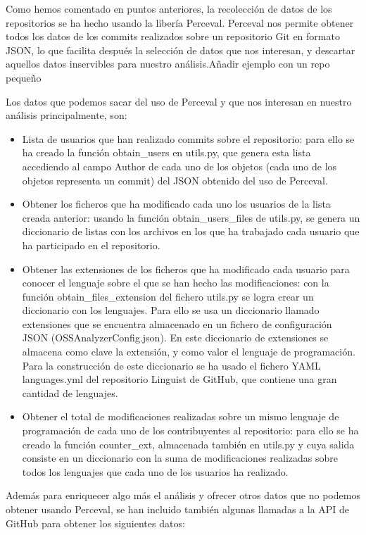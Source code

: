 \documentclass[a4paper, 12pt]{book}
\begin{document}
Como hemos comentado en puntos anteriores, la recolección de datos de los repositorios se ha hecho usando la libería Perceval. Perceval nos permite obtener todos los datos de los commits realizados sobre un repositorio Git en formato JSON, lo que facilita después la selección de datos que nos interesan, y descartar aquellos datos inservibles para nuestro análisis.{Añadir ejemplo con un repo pequeño}

Los datos que podemos sacar del uso de Perceval y que nos interesan en nuestro análisis principalmente, son:

\begin{itemize}
  \item Lista de usuarios que han realizado commits sobre el repositorio: para ello se ha creado la función obtain\_users en utils.py, que genera esta lista accediendo al campo Author de cada uno de los objetos (cada uno de los objetos representa un commit) del JSON obtenido del uso de Perceval.
  \item Obtener los ficheros que ha modificado cada uno los usuarios de la lista creada anterior: usando la función obtain\_users\_files de utils.py, se genera un diccionario de listas con los archivos en los que ha trabajado cada usuario que ha participado en el repositorio.
  \item Obtener las extensiones de los ficheros que ha modificado cada usuario para conocer el lenguaje sobre el que se han hecho las modificaciones: con la función obtain\_files\_extension del fichero utils.py se logra crear un diccionario con los lenguajes. Para ello se usa un diccionario llamado extensiones que se encuentra almacenado en un fichero de configuración JSON (OSSAnalyzerConfig.json). En este diccionario de extensiones se almacena como clave la extensión, y como valor el lenguaje de programación. Para la construcción de este diccionario se ha usado el fichero YAML languages.yml del repositorio Linguist de GitHub, que contiene una gran cantidad de lenguajes.
  \item Obtener el total de modificaciones realizadas sobre un mismo lenguaje de programación de cada uno de los contribuyentes al repositorio: para ello se ha creado la función counter\_ext, almacenada también en utils.py y cuya salida consiste en un diccionario con la suma de modificaciones realizadas sobre todos los lenguajes que cada uno de los usuarios ha realizado.
\end{itemize}

Además para enriquecer algo más el análisis y ofrecer otros datos que no podemos obtener usando Perceval, se han incluido también algunas llamadas a la API de GitHub para obtener los siguientes datos:
\end{document}
